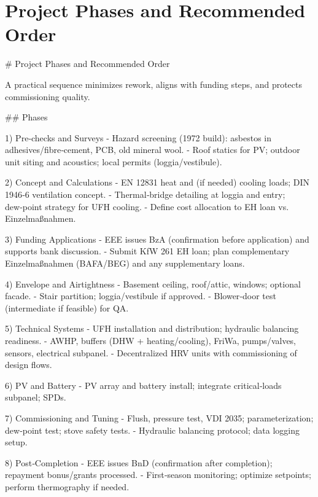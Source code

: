 \documentclass[11pt,oneside]{report}
\begin{document}
\chapter{Project Phases and Recommended Order}
\begin{markdown}
# Project Phases and Recommended Order

A practical sequence minimizes rework, aligns with funding steps, and protects commissioning quality.

## Phases

1) Pre‑checks and Surveys
- Hazard screening (1972 build): asbestos in adhesives/fibre‑cement, PCB, old mineral wool.
- Roof statics for PV; outdoor unit siting and acoustics; local permits (loggia/vestibule).

2) Concept and Calculations
- EN 12831 heat and (if needed) cooling loads; DIN 1946‑6 ventilation concept.
- Thermal‑bridge detailing at loggia and entry; dew‑point strategy for UFH cooling.
- Define cost allocation to EH loan vs. Einzelmaßnahmen.

3) Funding Applications
- EEE issues BzA (confirmation before application) and supports bank discussion.
- Submit KfW 261 EH loan; plan complementary Einzelmaßnahmen (BAFA/BEG) and any supplementary loans.

4) Envelope and Airtightness
- Basement ceiling, roof/attic, windows; optional facade.
- Stair partition; loggia/vestibule if approved.
- Blower‑door test (intermediate if feasible) for QA.

5) Technical Systems
- UFH installation and distribution; hydraulic balancing readiness.
- AWHP, buffers (DHW + heating/cooling), FriWa, pumps/valves, sensors, electrical subpanel.
- Decentralized HRV units with commissioning of design flows.

6) PV and Battery
- PV array and battery install; integrate critical‑loads subpanel; SPDs.

7) Commissioning and Tuning
- Flush, pressure test, VDI 2035; parameterization; dew‑point test; stove safety tests.
- Hydraulic balancing protocol; data logging setup.

8) Post‑Completion
- EEE issues BnD (confirmation after completion); repayment bonus/grants processed.
- First‑season monitoring; optimize setpoints; perform thermography if needed.
\end{markdown}
\end{document}
